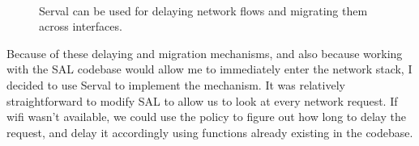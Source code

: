 \documentclass[12pt, fleqn]{article}
\begin{document}
\begin{figure}[htp]
  \centering  
  \\
  \caption{Serval can be used for delaying network flows and migrating them across interfaces. \label{fig-serval}}
\end{figure}


Because of these delaying and migration mechanisms, and also because working with
the SAL codebase would allow me to immediately enter the network stack, I
decided to use Serval to implement the mechanism. It was relatively 
straightforward to modify SAL to allow us to look at every network request. 
If wifi wasn't available, we could use the policy to figure out how long 
to delay the request, and delay it accordingly using functions already existing in the codebase.  
\end{document}

